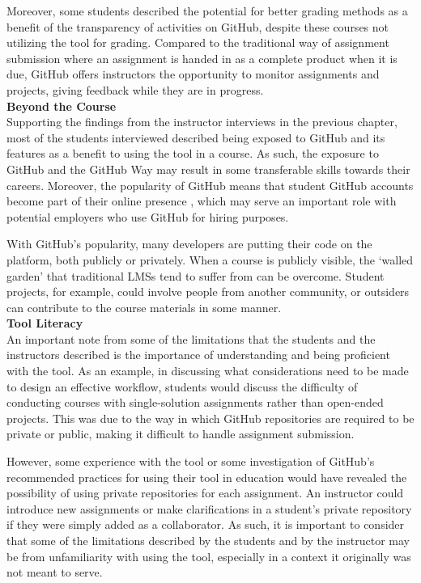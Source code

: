 Moreover, some students described the potential for better grading methods as a benefit of the transparency of activities on GitHub, despite these courses not utilizing the tool for grading. Compared to the traditional way of assignment submission where an assignment is handed in as a complete product when it is due, GitHub offers instructors the opportunity to monitor assignments and projects, giving feedback while they are in progress. \\

\textbf{Beyond the Course} \\
Supporting the findings from the instructor interviews in the previous chapter, most of the students interviewed described being exposed to GitHub and its features as a benefit to using the tool in a course. As such, the exposure to GitHub and the GitHub Way may result in some transferable skills towards their careers. Moreover, the popularity of GitHub means that student GitHub accounts become part of their online presence \cite{treude2012programming}, which may serve an important role with potential employers who use GitHub for hiring purposes.

With GitHub's popularity, many developers are putting their code on the platform, both publicly or privately. When a course is publicly visible, the `walled garden' that traditional LMSs tend to suffer from \cite{mott2010envisioning} can be overcome. Student projects, for example, could involve people from another community, or outsiders can contribute to the course materials in some manner. \\

\textbf{Tool Literacy} \\
An important note from some of the limitations that the students and the instructors described is the importance of understanding and being proficient with the tool. As an example, in discussing what considerations need to be made to design an effective workflow, students would discuss the difficulty of conducting courses with single-solution assignments rather than open-ended projects. This was due to the way in which GitHub repositories are required to be private or public, making it difficult to handle assignment submission.

However, some experience with the tool or some investigation of GitHub's recommended practices for using their tool in education would have revealed the possibility of using private repositories for each assignment. An instructor could introduce new assignments or make clarifications in a student's private repository if they were simply added as a collaborator. As such, it is important to consider that some of the limitations described by the students and by the instructor may be from unfamiliarity with using the tool, especially in a context it originally was not meant to serve.

